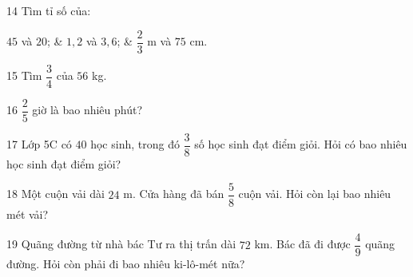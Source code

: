 \gap
\begin{probbox}{14}{\relax}
Tìm tỉ số của:
\begin{cols3}
 $45$ và $20$; &  $1{,}2$ và $3{,}6$; &  $\dfrac23$ m và $75$ cm.
\end{cols3}
\end{probbox}
\gap
\begin{probbox}{15}{\relax}
Tìm $\dfrac34$ của $56$ kg.
\end{probbox}
\gap
\begin{probbox}{16}{\relax}
$\dfrac25$ giờ là bao nhiêu phút?
\end{probbox}
\gap
\begin{probbox}{17}{\relax}
Lớp 5C có $40$ học sinh, trong đó $\dfrac38$ số học sinh đạt điểm giỏi. Hỏi có bao nhiêu học sinh đạt điểm giỏi?
\end{probbox}
\gap
\begin{probbox}{18}{\relax}
Một cuộn vải dài $24$ m. Cửa hàng đã bán $\dfrac58$ cuộn vải. Hỏi còn lại bao nhiêu mét vải?
\end{probbox}
\gap
\begin{probbox}{19}{\relax}
Quãng đường từ nhà bác Tư ra thị trấn dài $72$ km. Bác đã đi được $\dfrac49$ quãng đường. Hỏi còn phải đi bao nhiêu ki-lô-mét nữa?
\end{probbox}
